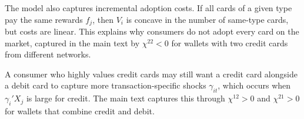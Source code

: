 \documentclass[main.tex]{subfiles}
\begin{document}
The model also captures incremental adoption costs.
If all cards of a given type pay the same rewards $f_j$, then $V_i$ is concave in the number of same-type cards, but costs are linear.
This explains why consumers do not adopt every card on the market, captured in the main text by $\chi^{22} < 0$ for wallets with two credit cards from different networks.

A consumer who highly values credit cards may still want a credit card alongside a debit card to capture more transaction-specific shocks $\gamma_{it}$, which occurs when $\gamma_i' X_j$ is large for credit.
The main text captures this through $\chi^{12} > 0$ and $\chi^{21} > 0$ for wallets that combine credit and debit.
\end{document}
